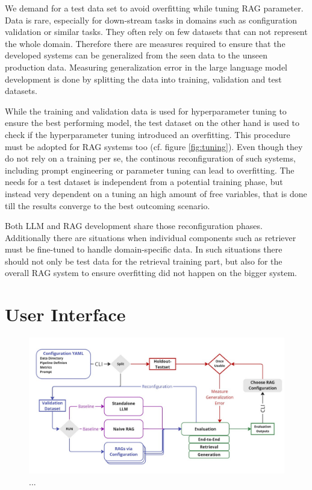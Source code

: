 

We demand for a test data set to avoid overfitting while tuning RAG parameter. Data is rare, especially for down-stream tasks in domains such as configuration validation or similar tasks. They often rely on few datasets that can not represent the whole domain. Therefore there are measures required to ensure that the developed systems can be generalized from the seen data to the unseen production data. Measuring generalization error in the large language model development is done by splitting the data into training, validation and test datasets. 

While the training and validation data is used for hyperparameter tuning to ensure the best performing model, the test dataset on the other hand is used to check if the hyperparameter tuning introduced an overfitting. This procedure must be adopted for RAG systems too (cf. figure \ref{fig:tuning}). Even though they do not rely on a training per se, the continous reconfiguration of such systems, including prompt engineering or parameter tuning can lead to overfitting. The needs for a test dataset is independent from a potential training phase, but instead very dependent on a tuning an high amount of free variables, that is done till the results converge to the best outcoming scenario.

Both LLM and RAG development share those reconfiguration phases. Additionally there are situations when individual components such as retriever must be fine-tuned to handle domain-specific data. In such situations there should not only be test data for the retrieval training part, but also for the overall RAG system to ensure overfitting did not happen on the bigger system.


\section{User Interface}

\begin{figure}[!ht]
    \centering
    \includegraphics[width=\textwidth]{images/Sketch.pdf}
    \caption{...}
    \label{fig:EvaluationDesign}
\end{figure}

